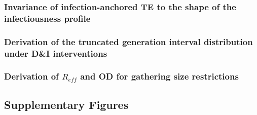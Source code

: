 \subsubsection{Invariance of infection-anchored TE to the shape of the infectiousness profile}
\label{sec:supplementary_methods_TE-invariance}

\subsubsection{Derivation of the truncated generation interval distribution under D\&I interventions}
\label{sec:supplementary_methods_truncated-gi-derivation}

\subsubsection{Derivation of $R_{eff}$ and OD for gathering size restrictions}
\label{sec:supplementary_methods_gathering-size}

\clearpage

\subsection{Supplementary Figures}